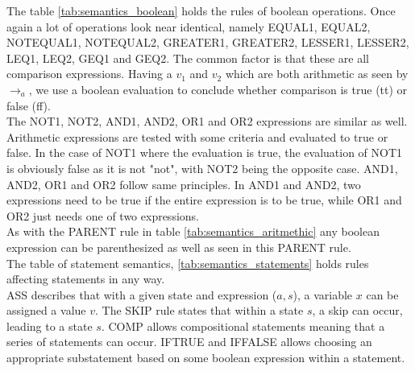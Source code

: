 The table \ref{tab:semantics_boolean} holds the rules of boolean operations. Once again a lot of operations look near identical, namely EQUAL1, EQUAL2, NOTEQUAL1, NOTEQUAL2, GREATER1, GREATER2, LESSER1, LESSER2, LEQ1, LEQ2, GEQ1 and GEQ2. The common factor is that these are all comparison expressions. Having a $v_{1}$ and $v_{2}$ which are both arithmetic as seen by $\rightarrow_{a}$, we use a boolean evaluation to conclude whether comparison is true (tt) or false (ff). \\
The NOT1, NOT2, AND1, AND2, OR1 and OR2 expressions are similar as well. Arithmetic expressions are tested with some criteria and evaluated to true or false. In the case of NOT1 where the evaluation is true, the evaluation of NOT1 is obviously false as it is not "not", with NOT2 being the opposite case. AND1, AND2, OR1 and OR2 follow same principles. In AND1 and AND2, two expressions need to be true if the entire expression is to be true, while OR1 and OR2 just needs one of two expressions. \\
As with the PARENT rule in table \ref{tab:semantics_aritmethic} any boolean expression can be parenthesized as well as seen in this PARENT rule. \\

The table of statement semantics, \ref{tab:semantics_statements} holds rules affecting statements in any way. \\
ASS describes that with a given state and expression ($a, s$), a variable $x$ can be assigned a value $v$. The SKIP rule states that within a state $s$, a skip can occur, leading to a state $s$. COMP allows compositional statements meaning that a series of statements can occur. IFTRUE and IFFALSE allows choosing an appropriate substatement based on some boolean expression within a statement. \\ 


